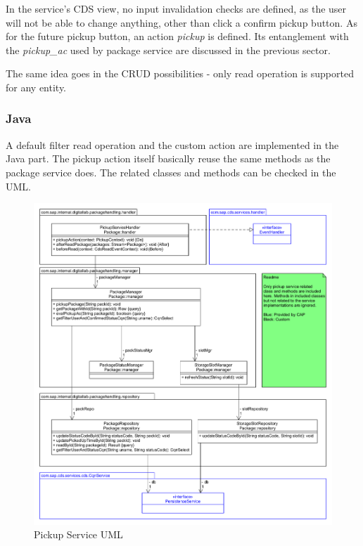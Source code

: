\bigskip
In the service's CDS view, no input invalidation checks are defined, as the user will not be able to change anything, other than click a confirm pickup button. As for the future pickup button, an action \textit{pickup} is defined. Its entanglement with the \textit{pickup\_ac} used by package service are discussed in the previous sector.

\bigskip
The same idea goes in the CRUD possibilities - only read operation is supported for any entity.

\subsubsection{Java}

A default filter read operation and the custom action are implemented in the Java part. The pickup action itself basically reuse the same methods as the package service does. The related classes and methods can be checked in the UML. 

\begin{figure}[!h]
    \centering
    \includegraphics[width=1\linewidth]{images/service_class_diagrams/pickup_service_class_diagram.png}
    \caption{Pickup Service UML}
    \label{fig:pickup_service_uml}
\end{figure}
\pagebreak

